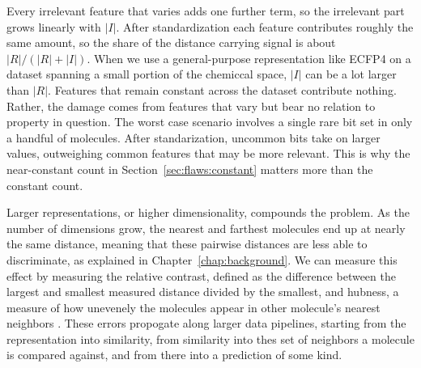 Every irrelevant feature that varies adds one further term, so the irrelevant part grows linearly with $|I|$. After standardization each feature contributes roughly the same amount, so the share of the distance carrying signal is about $|R|/(|R|+|I|)$. When we use a general-purpose representation like ECFP4 on a dataset spanning a small portion of the chemiccal space, $|I|$ can be a lot larger than $|R|$. Features that remain constant across the dataset contribute nothing. Rather, the damage comes from features that vary but bear no relation to property in question. The worst case scenario involves a single rare bit set in only a handful of molecules. After standarization, uncommon bits take on larger values, outweighing common features that may be more relevant. This is why the near-constant count in Section~\ref{sec:flaws:constant} matters more than the constant count.


Larger representations, or higher dimensionality, compounds the problem. As the number of dimensions grow, the nearest and farthest molecules end up at nearly the same distance, meaning that these pairwise distances are less able to discriminate, as explained in Chapter~\ref{chap:background}. We can measure this effect by measuring the relative contrast, defined as the difference between the largest and smallest measured distance divided by the smallest, and hubness, a measure of how unevenely the molecules appear in other molecule's nearest neighbors \citep{Radovanovic2010}. These errors propogate along larger data pipelines, starting from the representation into similarity, from similarity into thes set of neighbors a molecule is compared against, and from there into a prediction of some kind. 



